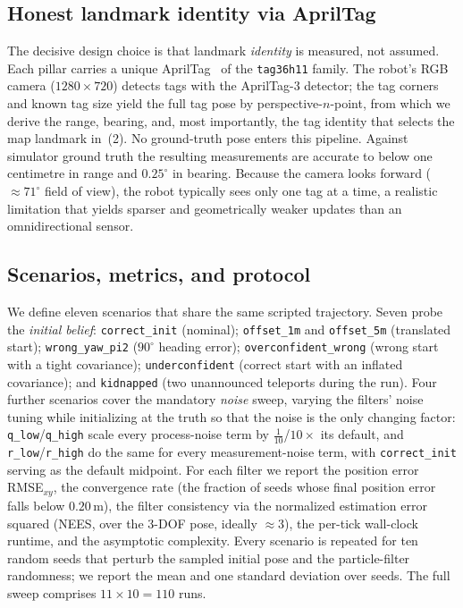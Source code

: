 \documentclass[conference]{IEEEtran}
\begin{document}
\subsection{Honest landmark identity via AprilTag}
The decisive design choice is that landmark \emph{identity} is measured, not assumed. Each pillar carries a unique AprilTag~\cite{Olson2011} of the \texttt{tag36h11} family. The robot's RGB camera ($1280\times720$) detects tags with the AprilTag-3 detector; the tag corners and known tag size yield the full tag pose by perspective-$n$-point, from which we derive the range, bearing, and, most importantly, the tag identity that selects the map landmark in~(2). No ground-truth pose enters this pipeline. Against simulator ground truth the resulting measurements are accurate to below one centimetre in range and $0.25^\circ$ in bearing. Because the camera looks forward ($\approx 71^\circ$ field of view), the robot typically sees only one tag at a time, a realistic limitation that yields sparser and geometrically weaker updates than an omnidirectional sensor.

\subsection{Scenarios, metrics, and protocol}
We define eleven scenarios that share the same scripted trajectory. Seven probe the \emph{initial belief}: \texttt{correct\_init} (nominal); \texttt{offset\_1m} and \texttt{offset\_5m} (translated start); \texttt{wrong\_yaw\_pi2} ($90^\circ$ heading error); \texttt{overconfident\_wrong} (wrong start with a tight covariance); \texttt{underconfident} (correct start with an inflated covariance); and \texttt{kidnapped} (two unannounced teleports during the run). Four further scenarios cover the mandatory \emph{noise} sweep, varying the filters' noise tuning while initializing at the truth so that the noise is the only changing factor: \texttt{q\_low}/\texttt{q\_high} scale every process-noise term by $\tfrac{1}{10}$/$10\times$ its default, and \texttt{r\_low}/\texttt{r\_high} do the same for every measurement-noise term, with \texttt{correct\_init} serving as the default midpoint. For each filter we report the position error RMSE$_{xy}$, the convergence rate (the fraction of seeds whose final position error falls below $0.20$\,m), the filter consistency via the normalized estimation error squared (NEES, over the 3-DOF pose, ideally $\approx 3$), the per-tick wall-clock runtime, and the asymptotic complexity. Every scenario is repeated for ten random seeds that perturb the sampled initial pose and the particle-filter randomness; we report the mean and one standard deviation over seeds. The full sweep comprises $11\times10=110$ runs.
\end{document}
